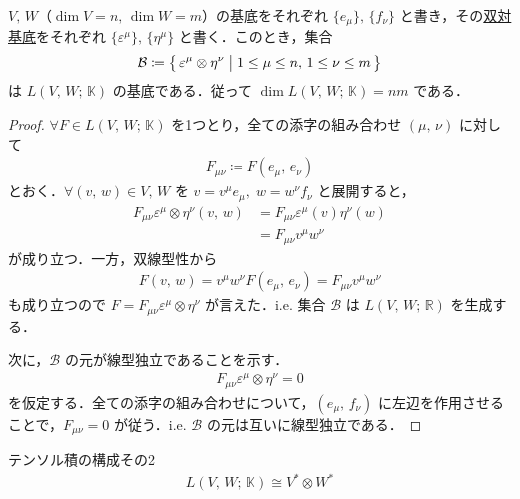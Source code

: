 \documentclass[geometry_main]{subfiles}
\begin{document}
\begin{myprop}[label=prop:basis-L]{}
	$V,\, W$（$\dim V = n,\, \dim W = m$）の基底をそれぞれ $\{e_\mu\},\, \{f_\nu\}$ と書き，その\hyperref[def.basisforDVS]{双対基底}をそれぞれ $\{\varepsilon^\mu\},\, \{\eta^\mu\}$ と書く．このとき，集合
	\begin{align}
		\mathcal{B} \coloneqq \bigl\{\, \varepsilon^\mu \otimes \eta^\nu \bigm| 1 \le \mu \le n,\, 1 \le \nu \le m \,\bigr\} 
	\end{align}
	は $L(V,\, W;\, \mathbb{K})$ の基底である．従って $\dim L(V,\, W;\, \mathbb{K}) = nm$ である．
\end{myprop}

\begin{proof}
	$\forall F  \in L(V,\, W;\, \mathbb{K})$ を1つとり，全ての添字の組み合わせ $(\mu,\, \nu)$ に対して
	\begin{align}
		F_{\mu\nu} \coloneqq F(e_\mu,\, e_\nu)
	\end{align}
	とおく．$\forall (v,\, w) \in V,\, W$ を $v = v^\mu e_\mu,\; w = w^\nu f_\nu$ と展開すると，
	\begin{align}
		F_{\mu\nu} \varepsilon^\mu \otimes \eta^\nu (v,\, w) &= F_{\mu\nu} \varepsilon^{\mu}(v) \eta^\nu(w) \\
		&= F_{\mu\nu} v^\mu w^\nu
	\end{align}
	が成り立つ．一方，双線型性から
	\begin{align}
		F(v,\, w) = v^\mu w^\nu F(e_\mu,\, e_\nu) = F_{\mu\nu} v^\mu w^\nu
	\end{align}
	も成り立つので $F = F_{\mu\nu} \varepsilon^\mu \otimes \eta^\nu$ が言えた．i.e. 集合 $\mathcal{B}$ は $L(V,\, W;\, \mathbb{R})$ を生成する．

	次に，$\mathcal{B}$ の元が線型独立であることを示す．
	\begin{align}
		F_{\mu\nu} \varepsilon^\mu \otimes \eta^\nu = 0
	\end{align}
	を仮定する．全ての添字の組み合わせについて，$(e_\mu,\, f_\nu)$ に左辺を作用させることで，$F_{\mu\nu} = 0$ が従う．i.e. $\mathcal{B}$ の元は互いに線型独立である．
\end{proof}


\begin{myprop}[label=prop:tensor-multillinear]{テンソル積の構成その2}
	\begin{align}
		L(V,\, W;\, \mathbb{K}) \cong V^* \otimes W^*
	\end{align}
\end{myprop}
\end{document}
